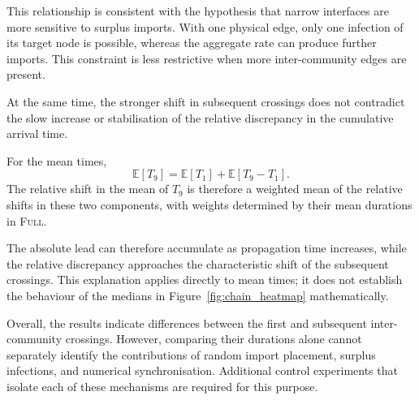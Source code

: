 \documentclass[a4paper,fleqn]{cas-sc}
\newcommand{\Full}{\textup{\textsc{Full}}}
\begin{document}
This relationship is consistent with the hypothesis that narrow interfaces are more sensitive to surplus imports. With one physical edge, only one infection of its target node is possible, whereas the aggregate rate can produce further imports. This constraint is less restrictive when more inter-community edges are present.

At the same time, the stronger shift in subsequent crossings does not contradict the slow increase or stabilisation of the relative discrepancy in the cumulative arrival time.

For the mean times,
\begin{equation}
\mathbb{E}[T_9]
=
\mathbb{E}[T_1]
+
\mathbb{E}[T_9-T_1].
\end{equation}
The relative shift in the mean of $T_9$ is therefore a weighted mean of the relative shifts in these two components, with weights determined by their mean durations in \Full{}.

The absolute lead can therefore accumulate as propagation time increases, while the relative discrepancy approaches the characteristic shift of the subsequent crossings. This explanation applies directly to mean times; it does not establish the behaviour of the medians in Figure~\ref{fig:chain_heatmap} mathematically.

Overall, the results indicate differences between the first and subsequent inter-community crossings. However, comparing their durations alone cannot separately identify the contributions of random import placement, surplus infections, and numerical synchronisation. Additional control experiments that isolate each of these mechanisms are required for this purpose.



\end{document}
